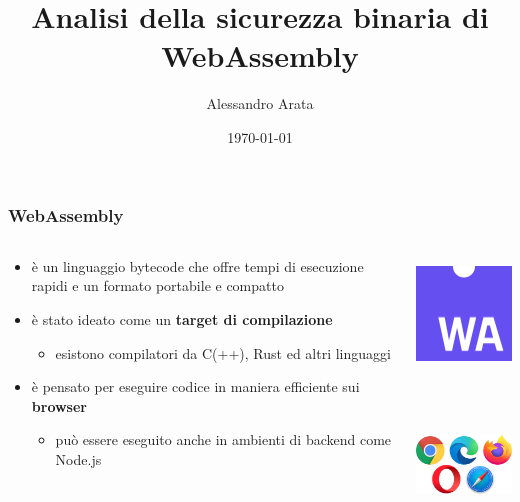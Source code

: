 \documentclass{beamer}
\begin{document}
\title{Analisi della sicurezza binaria di WebAssembly}
\author{Alessandro Arata}
\date{\today}

\begin{frame}
  \titlepage
\end{frame}

\begin{frame}
  \frametitle{WebAssembly}
  \begin{columns}
    \begin{column}{0.6\textwidth}
      \begin{itemize}
        \item è un linguaggio bytecode che offre tempi di esecuzione rapidi e un
        formato portabile e compatto
        \item è stato ideato come un \textbf{target di compilazione}
        \begin{itemize}
          \item esistono compilatori da C(++), Rust ed altri linguaggi
        \end{itemize}
        \item è pensato per eseguire codice in maniera efficiente sui
          \textbf{browser} 
        \begin{itemize}
          \item può essere eseguito anche in ambienti di backend come Node.js
        \end{itemize}
      \end{itemize}
    \end{column}
    \begin{column}{0.4\textwidth}
      \centerline{\includegraphics[width=3cm,height=3cm,keepaspectratio]{images/logo.png}}
      \newline\newline\newline
      \centerline{\includegraphics[width=4cm,height=4cm,keepaspectratio]{images/browser-logos.png}}
    \end{column}
  \end{columns}
\end{frame}
\end{document}
